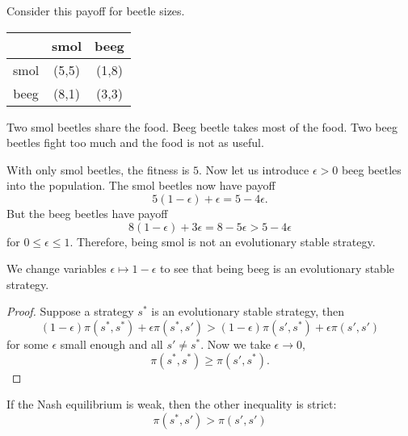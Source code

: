 \begin{aexample}{}{}
    Consider this payoff for beetle sizes. \begin{center}
        \begin{tabular}{|c|c c|} 
            \hline &smol& beeg \\
            
            \hline
            smol&(5,5)&(1,8)\\
            \hline beeg&(8,1)&(3,3)
            \\ \hline
        \end{tabular}
    \end{center}
    Two smol beetles share the food. Beeg beetle takes most of the food. Two beeg beetles fight too much and the food is not as useful.

    With only smol beetles, the fitness is $5$. Now let us introduce $\epsilon>0$ beeg beetles into the population. The smol beetles now have payoff \[
    5(1-\epsilon)+ \epsilon = 5-4\epsilon.
    \]
    But the beeg beetles have payoff \[
    8(1-\epsilon) + 3\epsilon = 8-5\epsilon > 5-4\epsilon
    \]
    for $0\leq\epsilon\leq 1$. Therefore, being smol is not an evolutionary stable strategy.

    We change variables $\epsilon\mapsto 1-\epsilon$ to see that being beeg is an evolutionary stable strategy.
\end{aexample}
\begin{proof}
    Suppose a strategy $s^*$ is an evolutionary stable strategy, then \[
        (1-\epsilon)\pi(s^*,s^*)+\epsilon \pi(s^*,s')>
        (1-\epsilon)\pi(s',s^*)+\epsilon\pi(s',s')
        \]
        for some $\epsilon$ small enough and all $s'\neq s^*$.
        Now we take $\epsilon\to 0 $,\[
            \pi(s^*,s^*)\geq\pi(s',s^*).
        \]
\end{proof}
\begin{remark}
    If the Nash equilibrium is weak, then the other inequality is strict:\[
        \pi(s^*,s')>
       \pi(s',s')
    \]
\end{remark}

